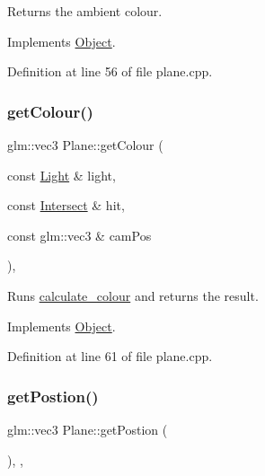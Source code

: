 Returns the ambient colour. 



Implements \mbox{\hyperlink{class_object_a0a966fb37be861cbaacb834ef7b89d8a}{Object}}.



Definition at line 56 of file plane.\+cpp.

\mbox{\label{class_plane_a6f2ddd0896e72b7446e2f9acad20c7c3}} 
\subsubsection{\texorpdfstring{get\+Colour()}{getColour()}\hspace{0.1cm}{\footnotesize\ttfamily [2/2]}}
{\footnotesize\ttfamily glm\+::vec3 Plane\+::get\+Colour (\begin{DoxyParamCaption}\item[{const \mbox{\hyperlink{class_light}{Light}} \&}]{light,  }\item[{const \mbox{\hyperlink{struct_intersect}{Intersect}} \&}]{hit,  }\item[{const glm\+::vec3 \&}]{cam\+Pos }\end{DoxyParamCaption})\hspace{0.3cm}{\ttfamily [override]}, {\ttfamily [virtual]}}



Runs \mbox{\hyperlink{util_8h_ae9aaa22b1b1c0249f8617f45eb99ad55}{calculate\+\_\+colour}} and returns the result. 



Implements \mbox{\hyperlink{class_object_aac162b545913d7aeab851204d3f04ebf}{Object}}.



Definition at line 61 of file plane.\+cpp.

\mbox{\label{class_plane_a61c43d837a1921039d9b3466d1284741}} 
\subsubsection{\texorpdfstring{get\+Postion()}{getPostion()}}
{\footnotesize\ttfamily glm\+::vec3 Plane\+::get\+Postion (\begin{DoxyParamCaption}{ }\end{DoxyParamCaption})\hspace{0.3cm}{\ttfamily [inline]}, {\ttfamily [override]}, {\ttfamily [virtual]}}



